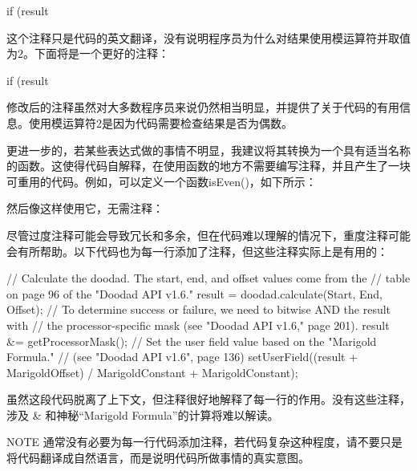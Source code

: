 \begin{cpp}
if (result %
\end{cpp}

这个注释只是代码的英文翻译，没有说明程序员为什么对结果使用模运算符并取值为2。下面将是一个更好的注释：

\begin{cpp}
if (result %
\end{cpp}

修改后的注释虽然对大多数程序员来说仍然相当明显，并提供了关于代码的有用信息。使用模运算符2是因为代码需要检查结果是否为偶数。

更进一步的，若某些表达式做的事情不明显，我建议将其转换为一个具有适当名称的函数。这使得代码自解释，在使用函数的地方不需要编写注释，并且产生了一块可重用的代码。例如，可以定义一个函数isEven()，如下所示：


然后像这样使用它，无需注释：

\begin{cpp}
if (isEven(result)) {
\end{cpp}

尽管过度注释可能会导致冗长和多余，但在代码难以理解的情况下，重度注释可能会有所帮助。以下代码也为每一行添加了注释，但这些注释实际上是有用的：

\begin{cpp}
// Calculate the doodad. The start, end, and offset values come from the
// table on page 96 of the "Doodad API v1.6."
result = doodad.calculate(Start, End, Offset);
// To determine success or failure, we need to bitwise AND the result with
// the processor-specific mask (see "Doodad API v1.6," page 201).
result &= getProcessorMask();
// Set the user field value based on the "Marigold Formula."
// (see "Doodad API v1.6", page 136)
setUserField((result + MarigoldOffset) / MarigoldConstant + MarigoldConstant);
\end{cpp}

虽然这段代码脱离了上下文，但注释很好地解释了每一行的作用。没有这些注释，涉及 \& 和神秘“Marigold Formula”的计算将难以解读。

\begin{myNotic}{NOTE}
通常没有必要为每一行代码添加注释，若代码复杂这种程度，请不要只是将代码翻译成自然语言，而是说明代码所做事情的真实意图。
\end{myNotic}

